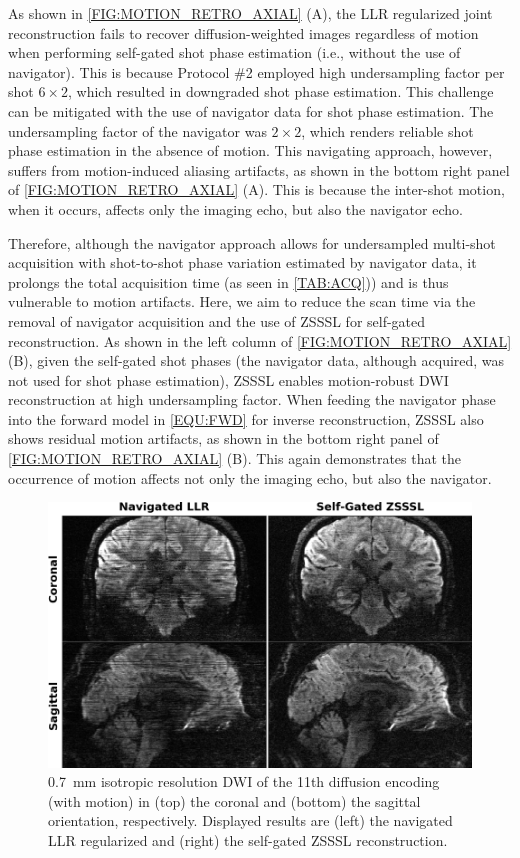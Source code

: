 \documentclass[journal,twoside,web]{ieeecolor}
\begin{document}
	As shown in \cref{FIG:MOTION_RETRO_AXIAL} (A),
	the LLR regularized joint reconstruction
	fails to recover diffusion-weighted images regardless of motion
	when performing self-gated shot phase estimation
	(i.e., without the use of navigator).
	This is because Protocol \#2 employed high undersampling factor per shot $6 \times 2$,
	which resulted in downgraded shot phase estimation.
	This challenge can be mitigated with the use of navigator data for shot phase estimation.
	The undersampling factor of the navigator was $2 \times 2$,
	which renders reliable shot phase estimation in the absence of motion.
	This navigating approach, however, suffers from motion-induced aliasing artifacts,
	as shown in the bottom right panel of \cref{FIG:MOTION_RETRO_AXIAL} (A).
	This is because the inter-shot motion, when it occurs, affects only the imaging echo,
	but also the navigator echo.

	Therefore, although the navigator approach allows for
	undersampled multi-shot acquisition with
	shot-to-shot phase variation estimated by navigator data,
	it prolongs the total acquisition time (as seen in \cref{TAB:ACQ}))
	and is thus vulnerable to motion artifacts.
	Here, we aim to reduce the scan time via the removal of navigator acquisition
	and the use of ZSSSL for self-gated reconstruction.
	As shown in the left column of \cref{FIG:MOTION_RETRO_AXIAL} (B),
	given the self-gated shot phases
	(the navigator data, although acquired, was not used for shot phase estimation),
	ZSSSL enables motion-robust DWI reconstruction at high undersampling factor.
	When feeding the navigator phase into the forward model in \cref{EQU:FWD}
	for inverse reconstruction, ZSSSL also shows residual motion artifacts,
	as shown in the bottom right panel of \cref{FIG:MOTION_RETRO_AXIAL} (B).
	This again demonstrates that
	the occurrence of motion affects not only the imaging echo,
	but also the navigator.


	\begin{figure}
		\centering
		\includegraphics[width=\columnwidth]{../figures/fig4.png}
		\caption{\SI{0.7}{\milli\meter} isotropic resolution DWI
			of the 11th diffusion encoding (with motion)
			in (top) the coronal and (bottom) the sagittal orientation, respectively.
			Displayed results are (left) the navigated LLR regularized
			and (right) the self-gated ZSSSL reconstruction.}
		\label{FIG:MOTION_RETRO_2}
	\end{figure}
\end{document}
